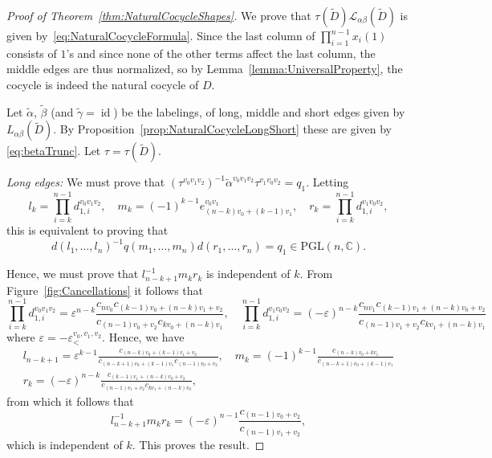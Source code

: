 \documentclass[12pt]{amsart}
\theoremstyle{definition}
\numberwithin{equation}{section}
\def\PGL{\mathrm{PGL}}
\DeclareMathOperator{\id}{id}
\def\C{\mathbb{C}}
\begin{document}
\begin{proof}[Proof of Theorem~\ref{thm:NaturalCocycleShapes}]
We prove that $\tau(\widetilde D)\mathcal L_{\alpha\beta}(\widetilde D)$ is given by~\eqref{eq:NaturalCocycleFormula}.
Since the last column of $\prod_{i=1}^{n-1}x_i(1)$ consists of $1$'s and since none of the other terms affect the last column, the middle edges are thus normalized, so by Lemma~\ref{lemma:UniversalProperty}, the cocycle is indeed the natural cocycle of $D$. 

Let $\widetilde \alpha$, $\widetilde \beta$ (and $\widetilde \gamma=\id$) be the labelings, of long, middle and short edges given by $L_{\alpha\beta}(\widetilde D)$. By Proposition~\ref{prop:NaturalCocycleLongShort} these are given by \eqref{eq:betaTrunc}. Let $\tau=\tau(\widetilde D)$.

\textit{Long edges:}
We must prove that $(\tau^{v_0v_1v_2})^{-1}\widetilde\alpha^{v_0v_1v_2}\tau^{v_1v_0v_2}=q_1$.
Letting 
\begin{equation}
l_k=\prod_{i=k}^{n-1}d^{v_0v_1v_2}_{1,i},\quad m_k=(-1)^{k-1}e^{v_0v_1}_{(n-k)v_0+(k-1)v_1},\quad r_k=\prod_{i=k}^{n-1}d^{v_1v_0v_2}_{1,i},
\end{equation}
this is equivalent to proving that
\begin{equation}
d(l_1,\dots,l_n)^{-1}q(m_1,\dots,m_n)d(r_1,\dots,r_n)=q_1\in\PGL(n,\C).
\end{equation}


Hence, we must prove that $l_{n-k+1}^{-1}m_kr_k$ is independent of $k$. From Figure~\ref{fig:Cancellations} it follows that
\begin{equation}
\prod_{i=k}^{n-1}d^{v_0v_1v_2}_{1,i}=\varepsilon^{n-k}\frac{c_{nv_0}c_{(k-1)v_0+(n-k)v_1+v_2}}{c_{(n-1)v_0+v_2}c_{kv_0+(n-k)v_1}},\quad \prod_{i=k}^{n-1}d^{v_1v_0v_2}_{1,i}=(-\varepsilon)^{n-k}\frac{c_{nv_1}c_{(k-1)v_1+(n-k)v_0+v_2}}{c_{(n-1)v_1+v_2}c_{kv_1+(n-k)v_1}}
\end{equation}
where $\varepsilon=-\varepsilon_<^{v_0,v_1,v_2}$. Hence, we have
\begin{equation}
\begin{gathered}
l_{n-k+1}=\varepsilon^{k-1}\frac{c_{(n-k)v_0+(k-1)v_1+v_2}}{c_{(n-k+1)v_0+(k-1)v_1}c_{(n-1)v_0+v_2}},\quad m_k=(-1)^{k-1}\frac{c_{(n-k)v_0+kv_1}}{c_{(n-k+1)v_0+(k-1)v_1}}\\
r_k=(-\varepsilon)^{n-k}\frac{c_{(k-1)v_1+(n-k)v_0+v_2}}{c_{(n-1)v_1+v_2}c_{kv_1+(n-k)v_0}},
\end{gathered}
\end{equation}
from which it follows that
\begin{equation}
l_{n-k+1}^{-1}m_kr_k=(-\varepsilon)^{n-1}\frac{c_{(n-1)v_0+v_2}}{c_{(n-1)v_1+v_2}},
\end{equation}
which is independent of $k$. This proves the result.



\end{proof}
\end{document}

